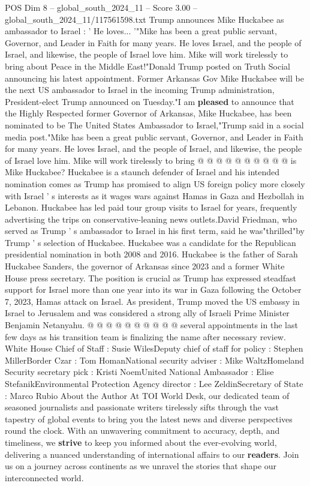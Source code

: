 \begin{textsample}{POS Dim 8 – global\_south\_2024\_11 – Score 3.00 – global\_south\_2024\_11/117561598.txt}  \label{ex:f8_pos_160}
Trump announces Mike Huckabee as ambassador to Israel : ' He loves... '"Mike has been a great public servant, Governor, and Leader in Faith for many years.
He loves Israel, and the people of Israel, and likewise, the people of Israel love him.
Mike will work tirelessly to bring about Peace in the Middle East!"Donald Trump posted on Truth Social announcing his latest appointment.
Former Arkansas Gov Mike Huckabee will be the next US ambassador to Israel in the incoming Trump administration, President-elect Trump announced on Tuesday."I am \textbf{pleased} to announce that the Highly Respected former Governor of Arkansas, Mike Huckabee, has been nominated to be The United States Ambassador to Israel,"Trump said in a social media post."Mike has been a great public servant, Governor, and Leader in Faith for many years.
He loves Israel, and the people of Israel, and likewise, the people of Israel love him.
Mike will work tirelessly to bring @ @ @ @ @ @ @ @ @ @ is Mike Huckabee?
Huckabee is a staunch defender of Israel and his intended nomination comes as Trump has promised to align US foreign policy more closely with Israel ' s interests as it wages wars against Hamas in Gaza and Hezbollah in Lebanon.
Huckabee has led paid tour group visits to Israel for years, frequently advertising the trips on conservative-leaning news outlets.David Friedman, who served as Trump ' s ambassador to Israel in his first term, said he was"thrilled"by Trump ' s selection of Huckabee.
Huckabee was a candidate for the Republican presidential nomination in both 2008 and 2016.
Huckabee is the father of Sarah Huckabee Sanders, the governor of Arkansas since 2023 and a former White House press secretary.
The position is crucial as Trump has expressed steadfast support for Israel more than one year into its war in Gaza following the October 7, 2023, Hamas attack on Israel.
As president, Trump moved the US embassy in Israel to Jerusalem and was considered a strong ally of Israeli Prime Minister Benjamin Netanyahu. @ @ @ @ @ @ @ @ @ @ several appointments in the last few days as his transition team is finalizing the name after necessary review.
White House Chief of Staff : Susie WilesDeputy chief of staff for policy : Stephen MillerBorder Czar : Tom HomanNational security adviser : Mike WaltzHomeland Security secretary pick : Kristi NoemUnited National Ambassador : Elise StefanikEnvironmental Protection Agency director : Lee ZeldinSecretary of State : Marco Rubio About the Author At TOI World Desk, our dedicated team of seasoned journalists and passionate writers tirelessly sifts through the vast tapestry of global events to bring you the latest news and diverse perspectives round the clock.
With an unwavering commitment to accuracy, depth, and timeliness, we \textbf{strive} to keep you informed about the ever-evolving world, delivering a nuanced understanding of international affairs to our \textbf{readers}.
Join us on a journey across continents as we unravel the stories that shape our interconnected world.

\end{textsample}
